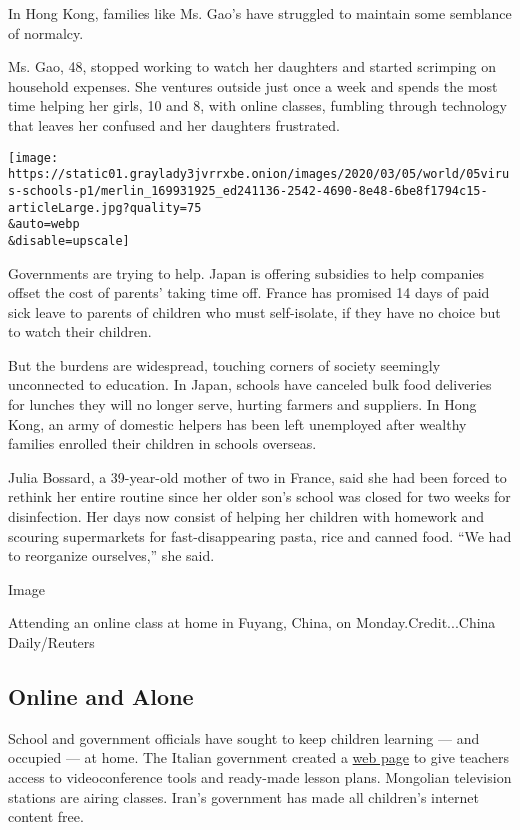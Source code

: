 In Hong Kong, families like Ms. Gao's have struggled to maintain some
semblance of normalcy.

Ms. Gao, 48, stopped working to watch her daughters and started
scrimping on household expenses. She ventures outside just once a week
and spends the most time helping her girls, 10 and 8, with online
classes, fumbling through technology that leaves her confused and her
daughters frustrated.

\texttt{[image: https://static01.graylady3jvrrxbe.onion/images/2020/03/05/world/05virus-schools-p1/merlin\_169931925\_ed241136-2542-4690-8e48-6be8f1794c15-articleLarge.jpg?quality=75\\\&auto=webp\\\&disable=upscale]}

Governments are trying to help. Japan is offering subsidies to help
companies offset the cost of parents' taking time off. France has
promised 14 days of paid sick leave to parents of children who must
self-isolate, if they have no choice but to watch their children.

But the burdens are widespread, touching corners of society seemingly
unconnected to education. In Japan, schools have canceled bulk food
deliveries for lunches they will no longer serve, hurting farmers and
suppliers. In Hong Kong, an army of domestic helpers has been left
unemployed after wealthy families enrolled their children in schools
overseas.

Julia Bossard, a 39-year-old mother of two in France, said she had been
forced to rethink her entire routine since her older son's school was
closed for two weeks for disinfection. Her days now consist of helping
her children with homework and scouring supermarkets for
fast-disappearing pasta, rice and canned food. ``We had to reorganize
ourselves,'' she said.

Image

Attending an online class at home in Fuyang, China, on
Monday.Credit...China Daily/Reuters

\hypertarget{online-and-alone}{%
\subsection{Online and Alone}\label{online-and-alone}}

School and government officials have sought to keep children learning
--- and occupied --- at home. The Italian government created a
\href{https://www.istruzione.it/coronavirus/didattica-a-distanza.html}{web
page} to give teachers access to videoconference tools and ready-made
lesson plans. Mongolian television stations are airing classes. Iran's
government has made all children's internet content free.

